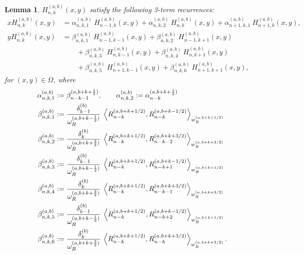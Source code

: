 \documentclass[11pt, oneside]{article}   	%
\newcommand{\half}{\frac{1}{2}}
\newcommand{\hdop}{H}
\newcommand{\hdopnk}{\hdop_{n,k}}
\newcommand{\alphaab}{\alpha^{(a,b)}}
\newcommand{\betaab}{\beta^{(a,b)}}
\newcommand{\genjac}{R}
\newcommand{\genjacnmk}{\genjac_{n-k}}
\newcommand{\genjacw}{w_\genjac}
\newcommand{\normgenjac}{\omega_\genjac}
\newtheorem{lemma}{Lemma}
\begin{document}
\begin{lemma}
$\hdopnk^{(a,b)}(x,y)$ satisfy the following 3-term recurrences:
\begin{align*}
x \hdopnk^{(a,b)}(x,y) &= \alphaab_{n,k,1} \: \hdop_{n-1, k}^{(a,b)}(x, y) + \alphaab_{n,k,2} \: \hdop_{n, k}^{(a,b)}(x, y) + \alphaab_{n+1,k,1} \: \hdop_{n+1, k}^{(a,b)}(x, y), \\
y \hdopnk^{(a,b)}(x,y) &= \betaab_{n,k,1} \: \hdop_{n-1, k-1}^{(a,b)}(x, y) + \betaab_{n,k,2} \: \hdop_{n-1, k+1}^{(a,b)}(x, y) \nonumber \\
		& \quad \quad + \betaab_{n,k,3} \: \hdop_{n, k-1}^{(a,b)}(x, y) + \betaab_{n,k,4} \: \hdop_{n, k+1}^{(a,b)}(x, y) \nonumber \\
		& \quad \quad + \betaab_{n,k,5} \: \hdop_{n+1, k-1}^{(a,b)}(x, y) + \betaab_{n,k,6} \: \hdop_{n+1, k+1}^{(a,b)}(x, y),
\end{align*}
for \((x,y) \in \Omega\), where
\begin{align*}
\alphaab_{n,k,1} &:= \beta_{n-k-1}^{(a, b+k+\half)}, \qquad \alphaab_{n,k,2} := \alpha_{n-k}^{(a, b+k+\half)} \\
\betaab_{n,k,1} &:= \frac{\delta_{k-1}^{(b)}}{\normgenjac^{(a, b + k - \half)}} \: \ip<\genjacnmk^{(a, b+k+1/2)}, \genjacnmk^{(a, b+k-1/2)}>_{\genjacw^{(a, b+k+1/2)}} \\
\betaab_{n,k,2} &:= \frac{\delta_{k}^{(b)}}{\normgenjac^{(a, b + k + \frac{3}{2})}} \: \ip<\genjacnmk^{(a, b+k+1/2)}, \genjac_{n-k-2}^{(a, b+k+{3/2})}>_{\genjacw^{(a, b+k+{3/2})}} \\
\betaab_{n,k,3} &:= \frac{\delta_{k-1}^{(b)}}{\normgenjac^{(a, b + k - \half)}} \: \ip<\genjacnmk^{(a, b+k+1/2)}, \genjac_{n-k+1}^{(a, b+k-1/2)}>_{\genjacw^{(a, b+k+1/2)}} \\
\betaab_{n,k,4} &:= \frac{\delta_{k}^{(b)}}{\normgenjac^{(a, b + k + \frac{3}{2})}} \: \ip<\genjacnmk^{(a, b+k+1/2)}, \genjac_{n-k-1}^{(a, b+k+{3/2})}>_{\genjacw^{(a, b+k+{3/2})}} \\
\betaab_{n,k,5} &:= \frac{\delta_{k-1}^{(b)}}{\normgenjac^{(a, b + k - \half)}} \: \ip<\genjacnmk^{(a, b+k+1/2)}, \genjac_{n-k+2}^{(a, b+k-1/2)}>_{\genjacw^{(a, b+k+1/2)}} \\
\betaab_{n,k,6} &:= \frac{\delta_{k}^{(b)}}{\normgenjac^{(a, b + k + \frac{3}{2})}} \: \ip<\genjacnmk^{(a, b+k+1/2)}, \genjacnmk^{(a, b+k+{3/2})}>_{\genjacw^{(a, b+k+{3/2})}}. 
\end{align*}

\end{lemma}
\end{document}
